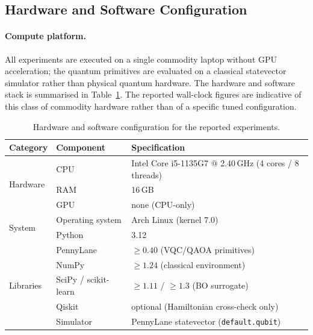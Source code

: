 \documentclass[11pt,a4paper]{article}
\theoremstyle{definition}
\begin{document}
\subsection{Hardware and Software Configuration}
\label{subsec:config}

\paragraph{Compute platform.}
All experiments are executed on a single commodity laptop without GPU acceleration; the quantum primitives are evaluated on a classical statevector simulator rather than physical quantum hardware. The hardware and software stack is summarised in Table~\ref{tab:platform}. The reported wall-clock figures are indicative of this class of commodity hardware rather than of a specific tuned configuration.

\begin{table}[t]
\centering
\small
\caption{Hardware and software configuration for the reported experiments.}
\label{tab:platform}
\begin{tabular}{@{}lll@{}}
\toprule
\textbf{Category} & \textbf{Component} & \textbf{Specification} \\
\midrule
\multirow{3}{*}{Hardware}
  & CPU & Intel Core i5-1135G7 @ 2.40\,GHz (4 cores / 8 threads) \\
  & RAM & 16\,GB \\
  & GPU & none (CPU-only) \\
\midrule
\multirow{2}{*}{System}
  & Operating system & Arch Linux (kernel 7.0) \\
  & Python & 3.12 \\
\midrule
\multirow{5}{*}{Libraries}
  & PennyLane & $\geq 0.40$ (VQC/QAOA primitives) \\
  & NumPy & $\geq 1.24$ (classical environment) \\
  & SciPy / scikit-learn & $\geq 1.11$ / $\geq 1.3$ (BO surrogate) \\
  & Qiskit & optional (Hamiltonian cross-check only) \\
  & Simulator & PennyLane statevector (\texttt{default.qubit}) \\
\bottomrule
\end{tabular}
\end{table}
\end{document}
